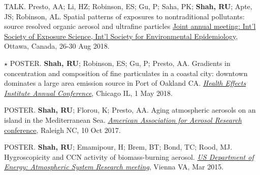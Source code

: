 \documentclass{article}
\begin{document}
\begin{etaremune}
\item {\tiny TALK.} Presto, AA; Li, HZ; Robinson, ES; Gu, P; Saha, PK; \textbf{Shah, RU}; Apte, JS; Robinson, AL. Spatial patterns of exposures to nontraditional pollutants: source resolved organic aerosol and ultrafine particles \href{https://ehp.niehs.nih.gov/doi/abs/10.1289/isesisee.2018.S02.03.08}{Joint annual meeting: Int'l Society of Exposure Science, Int'l Society for Environmental Epidemiology}, Ottawa, Canada, 26-30 Aug 2018.
\item {\Large $\star$} {\tiny POSTER.} \textbf{Shah, RU}; Robinson, ES; Gu, P; Presto, AA. Gradients in concentration and composition of fine particulates in a coastal city: downtown dominates a large area emission source in Port of Oakland CA. \href{https://www.healtheffects.org/sites/default/files/AnnualConferenceProgramBook2018_1.pdf}{\textit{Health Effects Institute Annual Conference}}, Chicago IL, 1 May 2018.
\item {\tiny POSTER.} \textbf{Shah, RU}; Florou, K; Presto, AA. Aging atmospheric aerosols on an island in the Mediterranean Sea. \href{http://aaarabstracts.com/2017/viewabstract.php?pid=200}{\textit{American Association for Aerosol Research} conference}, Raleigh NC, 10 Oct 2017.
\item {\tiny POSTER.} \textbf{Shah, RU}; Emamipour, H; Brem, BT; Bond, TC; Rood, MJ.  Hygroscopicity and CCN activity of biomass-burning aerosol. \textit{\href{http://asr.science.energy.gov/meetings/stm/posters/view?id=1325}{US Department of Energy: Atmospheric System Research meeting}}, Vienna VA, Mar 2015.
\end{etaremune}
\end{document}

